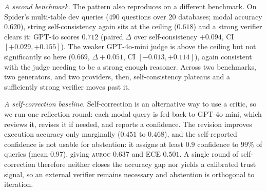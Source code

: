 \documentclass[11pt]{article}
\newcommand{\auroc}{\textsc{auroc}}
\begin{document}
\textit{A second benchmark.} The pattern also reproduces on a different benchmark. On Spider's
multi-table dev queries ($490$ questions over $20$ databases; modal accuracy $0.620$), string
self-consistency again sits at the ceiling ($0.618$) and a strong verifier clears it: GPT-4o scores
$0.712$ (paired $\Delta$ over self-consistency $+0.094$, CI $[+0.029, +0.155]$). The weaker GPT-4o-mini
judge is above the ceiling but not significantly so here ($0.669$, $\Delta +0.051$, CI
$[-0.013, +0.114]$), again consistent with the judge needing to be a strong enough reasoner. Across
two benchmarks, two generators, and two providers, then, self-consistency plateaus and a sufficiently
strong verifier moves past it.

\textit{A self-correction baseline.} Self-correction is an alternative way to use a critic, so we run
one reflection round: each modal query is fed back to GPT-4o-mini, which reviews it, revises it if
needed, and reports a confidence. The revision improves execution accuracy only marginally ($0.451$
to $0.468$), and the self-reported confidence is not usable for abstention: it assigns at least $0.9$
confidence to $99\%$ of queries (mean $0.97$), giving \auroc{} $0.637$ and ECE $0.501$. A single
round of self-correction therefore neither closes the accuracy gap nor yields a calibrated trust
signal, so an external verifier remains necessary and abstention is orthogonal to iteration.
\end{document}
